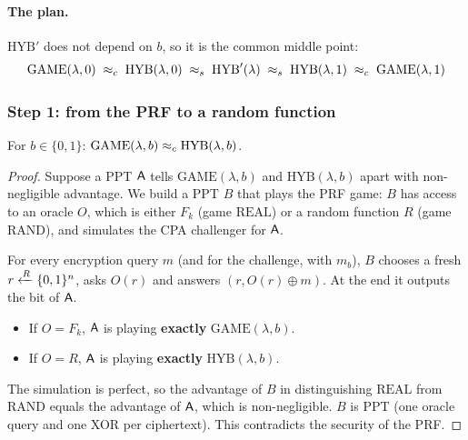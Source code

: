 \paragraph{The plan.} $\mathrm{HYB}'$ does not depend on $b$, so it is the common middle point:
\[
  \mathrm{GAME}(\lambda, 0) \;\approx_c\; \mathrm{HYB}(\lambda, 0) \;\approx_s\; \mathrm{HYB}'(\lambda) \;\approx_s\; \mathrm{HYB}(\lambda, 1) \;\approx_c\; \mathrm{GAME}(\lambda, 1)
\]

\subsubsection{Step 1: from the PRF to a random function}

\begin{framedlem}[label={lem:game-hyb}]{}
  For $b \in \{0,1\}$: $\mathrm{GAME}(\lambda, b) \approx_c \mathrm{HYB}(\lambda, b)$.
\end{framedlem}

\begin{proof}
  Suppose a PPT $\mathsf{A}$ tells $\mathrm{GAME}(\lambda, b)$ and $\mathrm{HYB}(\lambda, b)$ apart with non-negligible advantage. We build a PPT $B$ that plays the PRF game: $B$ has access to an oracle $O$, which is either $F_k$ (game $\mathrm{REAL}$) or a random function $R$ (game $\mathrm{RAND}$), and simulates the CPA challenger for $\mathsf{A}$.

  \begin{center}
  \end{center}

  For every encryption query $m$ (and for the challenge, with $m_b$), $B$ chooses a fresh $r \xleftarrow{R} \{0,1\}^n$, asks $O(r)$ and answers $(r, O(r) \oplus m)$. At the end it outputs the bit of $\mathsf{A}$.
  \begin{itemize}
    \item If $O = F_k$, $\mathsf{A}$ is playing \textbf{exactly} $\mathrm{GAME}(\lambda, b)$.
    \item If $O = R$, $\mathsf{A}$ is playing \textbf{exactly} $\mathrm{HYB}(\lambda, b)$.
  \end{itemize}
  The simulation is perfect, so the advantage of $B$ in distinguishing $\mathrm{REAL}$ from $\mathrm{RAND}$ equals the advantage of $\mathsf{A}$, which is non-negligible. $B$ is PPT (one oracle query and one XOR per ciphertext). This contradicts the security of the PRF.
\end{proof}

